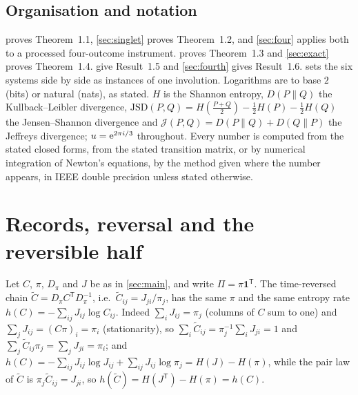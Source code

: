 \documentclass[11pt]{article}
\theoremstyle{definition}\newtheorem{definition}[theorem]{Definition}
\theoremstyle{remark}\newtheorem{remark}[theorem]{Remark}
\begin{document}
\subsection{Organisation and notation}\label{sec:org}
 proves Theorem~1.1, \cref{sec:singlet} proves Theorem~1.2, and \cref{sec:four} applies both to a processed four-outcome instrument.  proves Theorem~1.3 and \cref{sec:exact} proves Theorem~1.4.  give Result~1.5 and \cref{sec:fourth} gives Result~1.6.  sets the six systems side by side as instances of one involution. Logarithms are to base $2$ (bits) or natural (nats), as stated. $H$ is the Shannon entropy, $D(P\|Q)$ the Kullback--Leibler divergence, $\mathrm{JSD}(P,Q)=H(\frac{P+Q}2)-\frac12H(P)-\frac12H(Q)$ the Jensen--Shannon divergence and $\mathcal J(P,Q)=D(P\|Q)+D(Q\|P)$ the Jeffreys divergence; $u=\mathrm e^{2\pi i/3}$ throughout. Every number is computed from the stated closed forms, from the stated transition matrix, or by numerical integration of Newton's equations, by the method given where the number appears, in IEEE double precision unless stated otherwise.

\section{Records, reversal and the reversible half}\label{sec:split}
Let $C$, $\pi$, $D_\pi$ and $J$ be as in \cref{sec:main}, and write $\Pi=\pi\mathbf 1^{\mathsf T}$. The time-reversed chain $\tilde C=D_\pi C^{\mathsf T}D_\pi^{-1}$, i.e.\ $\tilde C_{ij}=J_{ji}/\pi_j$, has the same $\pi$ and the same entropy rate $h(C)=-\sum_{ij}J_{ij}\log C_{ij}$. Indeed $\sum_iJ_{ij}=\pi_j$ (columns of $C$ sum to one) and $\sum_jJ_{ij}=(C\pi)_i=\pi_i$ (stationarity), so $\sum_i\tilde C_{ij}=\pi_j^{-1}\sum_iJ_{ji}=1$ and $\sum_j\tilde C_{ij}\pi_j=\sum_jJ_{ji}=\pi_i$; and $h(C)=-\sum_{ij}J_{ij}\log J_{ij}+\sum_{ij}J_{ij}\log\pi_j=H(J)-H(\pi)$, while the pair law of $\tilde C$ is $\pi_j\tilde C_{ij}=J_{ji}$, so $h(\tilde C)=H(J^{\mathsf T})-H(\pi)=h(C)$.
\end{document}
